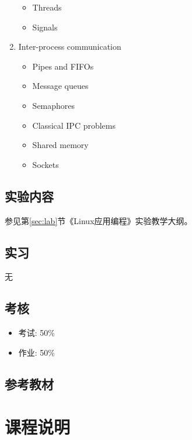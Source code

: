 \documentclass{wx672ctexart}
\begin{document}
\begin{enumerate}
\begin{itemize}
  \item Threads
  \item Signals
  \end{itemize}
\item Inter-process communication
  \begin{itemize}
  \item Pipes and FIFOs
  \item Message queues
  \item Semaphores
  \item Classical IPC problems
  \item Shared memory
  \item Sockets
  \end{itemize}
\end{enumerate}

\subsection{实验内容}
\label{sec-1-2}

参见第\ref{sec:lab}节《Linux应用编程》实验教学大纲。

\subsection{实习}
\label{sec-1-3}

无

\subsection{考核}
\label{sec-1-4}

\begin{itemize}
\item 考试: 50\%
\item 作业: 50\%
\end{itemize}

\subsection{参考教材}
\label{sec-1-5}

\nocite{cs241, matthew2008beginning, cooper10bash, raymond2003art, stevens2013advanced,
  love:2007:lsp:1205435, kerrisk:2010:lpi:1869911, bryant2010computersystems,
  silberschatz11essentials, tanenbaum2008modern, bovet2005understanding}
\printbibliography[heading=none]{}

\section{课程说明}
\label{sec-2}
\end{document}
